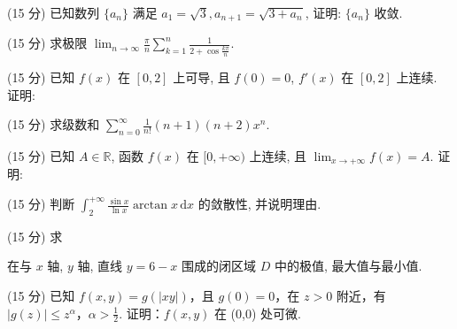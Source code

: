 (15 分) 已知数列 $\{a_{n}\}$ 满足 $a_{1} = \sqrt{3}, a_{n+1} = \sqrt{3 + a_{n}}$, 证明: $\{a_{n}\}$ 收敛.\par
(15 分) 求极限 $\lim_{n\to \infty}\frac{\pi}{n}\sum_{k = 1}^{n}\frac{1}{2 + \cos\frac{k\pi}{n}}.$\par
\par{}
(15 分) 已知 $f(x)$ 在 $[0,2]$ 上可导, 且 $f(0) = 0$, $f'(x)$ 在 $[0,2]$ 上连续. 证明:\par
\nopagebreak[4]
(15 分) 求级数和 $\sum_{n=0}^{\infty} \frac{1}{n!}(n+1)(n+2)x^{n}$.\par
\par{}
(15 分) 已知 $A \in \mathbb{R}$, 函数 $f(x)$ 在 $[0, +\infty)$ 上连续, 且 $\lim_{x \to +\infty} f(x) = A$. 证明:\par
\nopagebreak[4]
(15 分) 判断 $\int_{2}^{+\infty} \frac{\sin x}{\ln x} \arctan x \, \mathrm{d}x$ 的敛散性, 并说明理由.\par
\par{}
(15 分) 求\par
\nopagebreak[4]
在与 $x$ 轴, $y$ 轴, 直线 $y = 6 - x$ 围成的闭区域 $D$ 中的极值, 最大值与最小值.\par
(15 分) 已知 $f(x, y) = g(|xy|)$，且 $g(0) = 0$，在 $z > 0$ 附近，有 $|g(z)| \leq z^{\alpha}$，$\alpha > \frac{1}{2}$. 证明：$f(x, y)$ 在 (0,0) 处可微.\par
